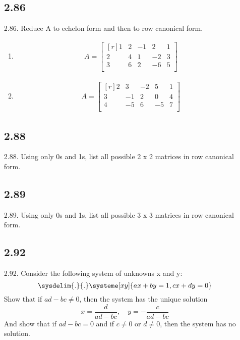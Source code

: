\documentclass{report}
\begin{document}
\begin{enumerate}
\subsection{2.86}
\item [2.86.] Reduce A to echelon form and then to row canonical form.
	\begin{enumerate}
	\item
	\begin{align*}
	A = 
	\begin{bmatrix*}[r]
	1 & 2 & -1 & 2 & 1\\
	2 & 4 & 1 & -2 & 3\\
	3 & 6 & 2 & -6 & 5\\
	\end{bmatrix*}
	\end{align*}
	\item
	\begin{align*}
	A = 
	\begin{bmatrix*}[r]
	2 & 3 & -2 & 5 & 1\\
	3 & -1 & 2 & 0 & 4\\
	4 & -5 & 6 & -5 & 7\\
	\end{bmatrix*}
	\end{align*}
	\end{enumerate}
\subsection{2.88}
\item [2.88.] Using only 0s and 1s, list all possible 2 x 2 matrices in row canonical form.
\subsection{2.89}
\item [2.89.] Using only 0s and 1s, list all possible 3 x 3 matrices in row canonical form.
\subsection{2.92}
\item [2.92.] Consider the following system of unknowns x and y:
\[ \sysdelim{.}{.}\systeme[xy]{ax+by=1,cx+dy=0} \]
Show that if $ad-bc \neq 0$, then the system has the unique solution
\[ x=\frac{d}{ad-bc}, \quad y=-\frac{c}{ad-bc} \]
And show that if $ad-bc=0$ and if $c \neq 0$ or $d \neq 0$, then the system has no solution.
\end{enumerate}
\end{document}

